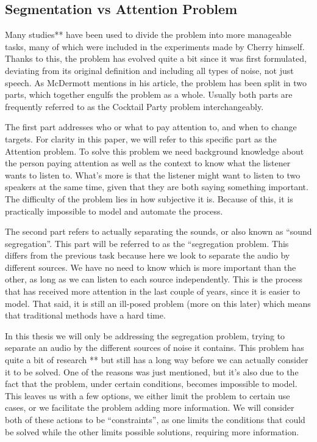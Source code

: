 \documentclass{book}
\begin{document}
\subsection{Segmentation vs Attention Problem}
\qquad Many studies** have been used to divide the problem into more manageable tasks, many of which were included in the experiments made by Cherry himself.
Thanks to this, the problem has evolved quite a bit since it was first formulated, deviating from its original definition and including all types of noise, not just speech.
As McDermott mentions in his article\cite{CocktailPartyProblemRevisit}, the problem has been split in two parts, which together engulfs the problem as a whole.
Usually both parts are frequently referred to as the Cocktail Party problem interchangeably.
\par
The first part addresses who or what to pay attention to, and when to change targets.
For clarity in this paper, we will refer to this specific part as the Attention problem.
To solve this problem we need background knowledge about the person paying attention as well as the context to know what the listener wants to listen to.
What's more is that the listener might want to listen to two speakers at the same time, given that they are both saying something important.
The difficulty of the problem lies in how subjective it is.
Because of this, it is practically impossible to model and automate the process.
\par
The second part refers to actually separating the sounds, or also known as “sound segregation”.
This part will be referred to as the “segregation problem.
This differs from the previous task because here we look to separate the audio by different sources.
We have no need to know which is more important than the other, as long as we can listen to each source independently.
This is the process that has received more attention in the last couple of years, since it is easier to model.
That said, it is still an ill-posed problem (more on this later) which means that traditional methods have a hard time.
\par
In this thesis we will only be addressing the segregation problem, trying to separate an audio by the different sources of noise it contains.
This problem has quite a bit of research ** but still has a long way before we can actually consider it to be solved.
One of the reasons was just mentioned, but it’s also due to the fact that the problem, under certain conditions, becomes impossible to model.
This leaves us with a few options, we either limit the problem to certain use cases, or we facilitate the problem adding more information.
We will consider both of these actions to be “constraints”, as one limits the conditions that could be solved while the other limits possible solutions, requiring more information.
\end{document}
